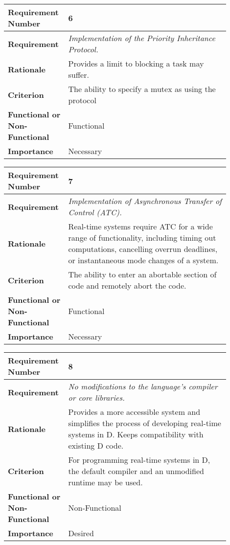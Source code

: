 \begin{table}[!h]
\centering
\begin{tabular}{|L{0.2\linewidth}|L{0.7\linewidth}|}
\hline
\textbf{Requirement Number} & 6 \\ \hline
\textbf{Requirement} & \emph{Implementation of the Priority Inheritance
Protocol.}\\ \hline
\textbf{Rationale}      & Provides a limit to blocking a task may suffer. \\ \hline
\textbf{Criterion}      & The ability to specify a mutex as using the protocol\\ \hline
\textbf{Functional or Non-Functional} & Functional \\ \hline
\textbf{Importance}     & Necessary \\ \hline
\end{tabular}
\end{table}
\begin{table}[!h]
\centering
\begin{tabular}{|L{0.2\linewidth}|L{0.7\linewidth}|}
\hline
\textbf{Requirement Number} & 7 \\ \hline
\textbf{Requirement} & \emph{Implementation of Asynchronous Transfer of Control
(ATC).} \\ \hline
\textbf{Rationale}      & Real-time systems require ATC for a wide range of functionality, 
                including timing out computations, cancelling overrun deadlines,  
                or instantaneous mode changes of a system. \\ \hline
\textbf{Criterion}      & The ability to enter an abortable section of code and remotely  
                abort the code. \\ \hline
\textbf{Functional or Non-Functional} & Functional \\ \hline
\textbf{Importance}     & Necessary \\ \hline
\end{tabular}
\end{table}
\begin{table}[!h]
\centering
\begin{tabular}{|L{0.2\linewidth}|L{0.7\linewidth}|}
\hline
\textbf{Requirement Number} & 8 \\ \hline
\textbf{Requirement} & \emph{No modifications to the language's compiler or
core libraries.} \\ \hline
\textbf{Rationale}      & Provides a more accessible system and simplifies the  
                process of developing real-time systems in D. 
                Keeps compatibility with existing D code. \\ \hline
\textbf{Criterion}      & For programming real-time systems in D, the default compiler and  
                an unmodified runtime may be used. \\ \hline
\textbf{Functional or Non-Functional} & Non-Functional \\ \hline
\textbf{Importance}     & Desired \\ \hline
\end{tabular}
\end{table}
